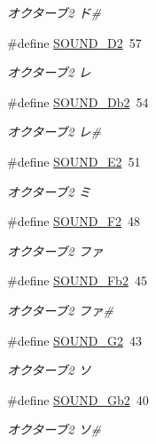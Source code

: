 \begin{DoxyCompactItemize}
\begin{DoxyCompactList}\small\item\em オクターブ2 ド\# \end{DoxyCompactList}\item 
\#define \hyperlink{sound_8h_a24efb33152ca6f7c832a646cefc86f32_a24efb33152ca6f7c832a646cefc86f32}{S\+O\+U\+N\+D\+\_\+\+D2}~57
\begin{DoxyCompactList}\small\item\em オクターブ2 レ \end{DoxyCompactList}\item 
\#define \hyperlink{sound_8h_a7d2839cfd7ade12ff92a685da8405db3_a7d2839cfd7ade12ff92a685da8405db3}{S\+O\+U\+N\+D\+\_\+\+Db2}~54
\begin{DoxyCompactList}\small\item\em オクターブ2 レ\# \end{DoxyCompactList}\item 
\#define \hyperlink{sound_8h_a52d7912c62673a809f44656740543ba5_a52d7912c62673a809f44656740543ba5}{S\+O\+U\+N\+D\+\_\+\+E2}~51
\begin{DoxyCompactList}\small\item\em オクターブ2 ミ \end{DoxyCompactList}\item 
\#define \hyperlink{sound_8h_a5efc510793cd609c997915070db58dd0_a5efc510793cd609c997915070db58dd0}{S\+O\+U\+N\+D\+\_\+\+F2}~48
\begin{DoxyCompactList}\small\item\em オクターブ2 ファ \end{DoxyCompactList}\item 
\#define \hyperlink{sound_8h_a1aa4dea5958d3b0a7c9ff406073fdd37_a1aa4dea5958d3b0a7c9ff406073fdd37}{S\+O\+U\+N\+D\+\_\+\+Fb2}~45
\begin{DoxyCompactList}\small\item\em オクターブ2 ファ\# \end{DoxyCompactList}\item 
\#define \hyperlink{sound_8h_add206c6691e048cc1ce70f995384dbb8_add206c6691e048cc1ce70f995384dbb8}{S\+O\+U\+N\+D\+\_\+\+G2}~43
\begin{DoxyCompactList}\small\item\em オクターブ2 ソ \end{DoxyCompactList}\item 
\#define \hyperlink{sound_8h_a73fd8b78bb50cd9cdbd8a1c09400262d_a73fd8b78bb50cd9cdbd8a1c09400262d}{S\+O\+U\+N\+D\+\_\+\+Gb2}~40
\begin{DoxyCompactList}\small\item\em オクターブ2 ソ\# \end{DoxyCompactList}\item 

\end{DoxyCompactItemize}
